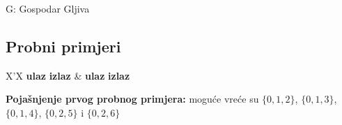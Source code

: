 \begin{statement}[
  timelimit=1 s,
  memorylimit=512 MiB,
]{G: Gospodar Gljiva}
\subsection*{Probni primjeri}
\begin{tabularx}{\textwidth}{X'X}
  \textbf{ulaz}
  \linespread{1}{}
  \textbf{izlaz}
  \linespread{1}{} &
  \textbf{ulaz}
  \linespread{1}{}
  \textbf{izlaz}
  \linespread{1}{}
\end{tabularx}

\textbf{Pojašnjenje prvog probnog primjera:} moguće vreće su $\{0, 1, 2\}$, $\{0, 1, 3\}$, $\{0, 1, 4\}$, $\{0, 2, 5\}$ i $\{0, 2, 6\}$

\end{statement}


